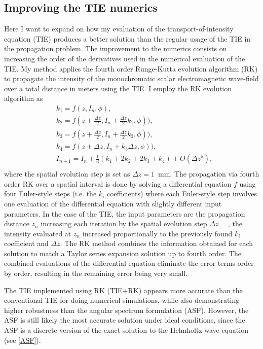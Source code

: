 \documentclass[10pt, a4paper, singlespacing]{report}
\begin{document}
\subsection{Improving the TIE numerics}\label{TIE+RK}
Here I want to expand on how my evaluation of the transport-of-intensity equation (TIE) produces a better solution than the regular usage of the TIE in the propagation problem.
The improvement to the numerics consists on increasing the order of the derivatives used in the numerical evaluation of the TIE. My method applies the fourth order Runge-Kutta evolution algorithm (RK) to propagate the intensity of the monochromatic scalar electromagnetic wave-field over a total distance in meters using the TIE. I employ the RK evolution algorithm as
\begin{equation} \label{eq:17}
\begin{split}
&k_1 = f(z, I_n, \phi),\\
&k_2 = f(z + \frac{\Delta z}{2}, I_n + \frac{\Delta z }{2}k_1, \phi)),\\
&k_3 = f(z + \frac{\Delta z}{2}, I_n + \frac{\Delta z }{2}k_2, \phi)),\\
&k_4 = f(z + \Delta z, I_n + k_3 \Delta z, \phi)),\\
&I_{n + 1} = I_{n} + \frac{1}{6}(k_1 + 2k_2 + 2k_3 + k_4) + O(\Delta z^5),\\
\end{split}
\end{equation}
where the spatial evolution step is set as $\Delta z = 1$~mm. The propagation via fourth order RK over a spatial interval is done by solving a differential equation $f$ using four Euler-style steps (i.e. the $k_i$ coefficients) where each Euler-style step involves one evaluation of the differential equation with slightly different input parameters. In the case of the TIE, the input parameters are the propagation distance $z_n$ increasing each iteration by the spatial evolution step $\Delta z = $, the intensity evaluated at $z_n$ increased proportionally to the previously found $k_i$ coefficient and $\Delta z$. The RK method combines the information obtained for each solution to match a Taylor series expansion solution up to fourth order. The combined evaluations of the differential equation eliminate the error terms order by order, resulting in the remaining error being very small\cite{N_R}.

The TIE implemented using RK (TIE+RK) appears more accurate than the conventional TIE for doing numerical simulations, while also demonstrating higher robustness than the angular spectrum formulation (ASF). However, the ASF is still likely the most accurate solution under ideal conditions, since the ASF is a discrete version of the exact solution to the Helmholtz wave equation (see \ref{ASF}).
\end{document}
